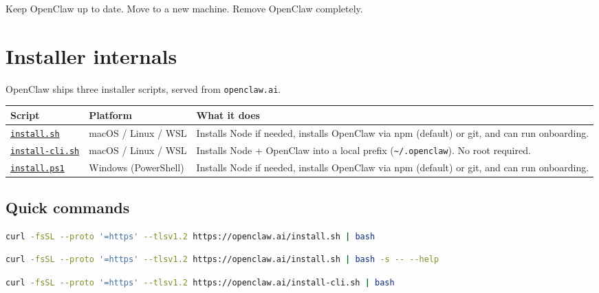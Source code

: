 Keep OpenClaw up to date.
Move to a new machine.
Remove OpenClaw completely.


\clearpage

\section{Installer internals}


OpenClaw ships three installer scripts, served from \texttt{openclaw.ai}.


\begin{table}[h]
\centering
\small
\begin{tabular}{|l|l|l|}
\hline
Script & Platform & What it does \\
\hline
\href{\#installsh}{\texttt{install.sh}} & macOS / Linux / WSL & Installs Node if needed, installs OpenClaw via npm (default) or git, and can run onboarding. \\
\hline
\href{\#install-clish}{\texttt{install-cli.sh}} & macOS / Linux / WSL & Installs Node + OpenClaw into a local prefix (\texttt{\textasciitilde{}/.openclaw}). No root required. \\
\hline
\href{\#installps1}{\texttt{install.ps1}} & Windows (PowerShell) & Installs Node if needed, installs OpenClaw via npm (default) or git, and can run onboarding. \\
\hline
\end{tabular}
\end{table}



\subsection{Quick commands}


\begin{lstlisting}[language=bash]
    curl -fsSL --proto '=https' --tlsv1.2 https://openclaw.ai/install.sh | bash
\end{lstlisting}


\begin{lstlisting}[language=bash]
    curl -fsSL --proto '=https' --tlsv1.2 https://openclaw.ai/install.sh | bash -s -- --help
\end{lstlisting}


\begin{lstlisting}[language=bash]
    curl -fsSL --proto '=https' --tlsv1.2 https://openclaw.ai/install-cli.sh | bash
\end{lstlisting}


